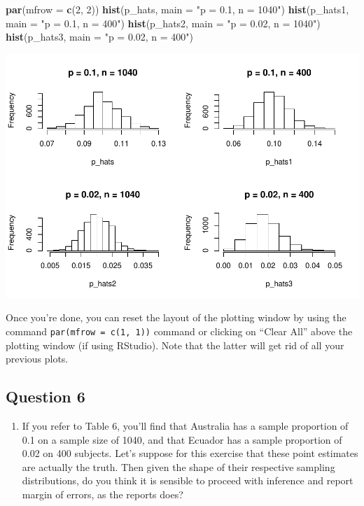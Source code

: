 \documentclass[]{article}
\newenvironment{Shaded}{\begin{snugshade}}{\end{snugshade}}
\newcommand{\KeywordTok}[1]{\textcolor[rgb]{0.13,0.29,0.53}{\textbf{#1}}}
\newcommand{\DataTypeTok}[1]{\textcolor[rgb]{0.13,0.29,0.53}{#1}}
\newcommand{\DecValTok}[1]{\textcolor[rgb]{0.00,0.00,0.81}{#1}}
\newcommand{\StringTok}[1]{\textcolor[rgb]{0.31,0.60,0.02}{#1}}
\newcommand{\NormalTok}[1]{#1}
\providecommand{\tightlist}{%
  \setlength{\itemsep}{0pt}\setlength{\parskip}{0pt}}
\begin{document}
\begin{Shaded}
\begin{Highlighting}[]
\KeywordTok{par}\NormalTok{(}\DataTypeTok{mfrow =} \KeywordTok{c}\NormalTok{(}\DecValTok{2}\NormalTok{, }\DecValTok{2}\NormalTok{))}
\KeywordTok{hist}\NormalTok{(p_hats, }\DataTypeTok{main =} \StringTok{"p = 0.1, n = 1040"}\NormalTok{)}
\KeywordTok{hist}\NormalTok{(p_hats1, }\DataTypeTok{main =} \StringTok{"p = 0.1, n = 400"}\NormalTok{)}
\KeywordTok{hist}\NormalTok{(p_hats2, }\DataTypeTok{main =} \StringTok{"p = 0.02, n = 1040"}\NormalTok{)}
\KeywordTok{hist}\NormalTok{(p_hats3, }\DataTypeTok{main =} \StringTok{"p = 0.02, n = 400"}\NormalTok{)}
\end{Highlighting}
\end{Shaded}

\includegraphics{DATA_606_Lab_6_files/figure-latex/unnamed-chunk-5-1.pdf}

Once you're done, you can reset the layout of the plotting window by
using the command \texttt{par(mfrow\ =\ c(1,\ 1))} command or clicking
on ``Clear All'' above the plotting window (if using RStudio). Note that
the latter will get rid of all your previous plots.

\subsection{Question 6}\label{question-6-1}

\begin{enumerate}
\def\labelenumi{\arabic{enumi}.}
\setcounter{enumi}{10}
\tightlist
\item
  If you refer to Table 6, you'll find that Australia has a sample
  proportion of 0.1 on a sample size of 1040, and that Ecuador has a
  sample proportion of 0.02 on 400 subjects. Let's suppose for this
  exercise that these point estimates are actually the truth. Then given
  the shape of their respective sampling distributions, do you think it
  is sensible to proceed with inference and report margin of errors, as
  the reports does?
\end{enumerate}
\end{document}
